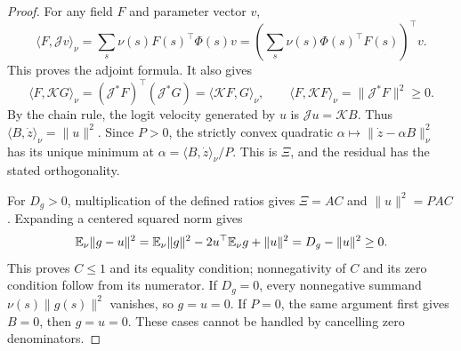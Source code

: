 \begin{proof}
For any field $F$ and parameter vector $v$,
\[
 \langle F,\mathcal Jv\rangle_\nu
 =\sum_s\nu(s)F(s)^\top\Phi(s)v
 =\left(\sum_s\nu(s)\Phi(s)^\top F(s)\right)^\top v.
\]
This proves the adjoint formula. It also gives
\[
 \langle F,\mathcal KG\rangle_\nu
 =(\mathcal J^*F)^\top(\mathcal J^*G)
 =\langle\mathcal KF,G\rangle_\nu,
 \qquad \langle F,\mathcal KF\rangle_\nu=\|\mathcal J^*F\|^2\ge0.
\]
By the chain rule, the logit velocity generated by $u$ is $\mathcal Ju=\mathcal KB$. Thus $\langle B,\dot z\rangle_\nu=\|u\|^2$. Since $P>0$, the strictly convex quadratic $\alpha\mapsto\|\dot z-\alpha B\|_\nu^2$ has its unique minimum at $\alpha=\langle B,\dot z\rangle_\nu/P$. This is $\Xi$, and the residual has the stated orthogonality.

For $D_g>0$, multiplication of the defined ratios gives $\Xi=AC$ and $\|u\|^2=PAC$. Expanding a centered squared norm gives
\[
 \mathbb{E}_\nu\|g-u\|^2
 =\mathbb{E}_\nu\|g\|^2-2u^\top\mathbb{E}_\nu g+\|u\|^2
 =D_g-\|u\|^2\ge0.
\]
This proves $C\le1$ and its equality condition; nonnegativity of $C$ and its zero condition follow from its numerator. If $D_g=0$, every nonnegative summand $\nu(s)\|g(s)\|^2$ vanishes, so $g=u=0$. If $P=0$, the same argument first gives $B=0$, then $g=u=0$. These cases cannot be handled by cancelling zero denominators.
\end{proof}


